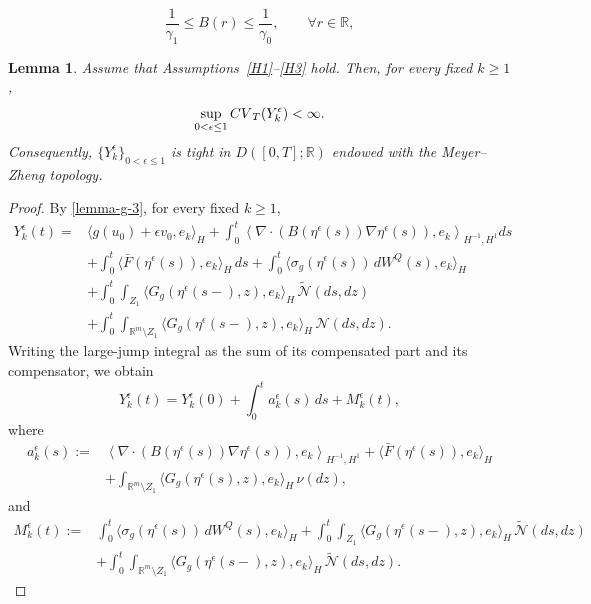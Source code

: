 \documentclass[10pt,a4paper]{amsart}
\theoremstyle{plain}
\newtheorem{lemma}[theorem]{Lemma}
\numberwithin{equation}{section}
\begin{document}
\begin{equation}\label{lemma-Br}
\frac{1}{\gamma_1} \leq B(r) \leq \frac{1}{\gamma_0}, \qquad \forall r \in \mathbb{R},
\end{equation}

\begin{lemma}\label{lem:conditional-variation-Yk}
Assume that Assumptions~\ref{H1}--\ref{H3} hold. Then, for every fixed \(k\ge1\),
\[
\sup_{0<\epsilon\le1}{\rm CV}_{T}(Y_k^\epsilon)<\infty .
\]
Consequently, \(\{Y_k^\epsilon\}_{0<\epsilon\le1}\) is tight in \(D([0,T];\mathbb R)\) endowed with the Meyer--Zheng topology.
\end{lemma}

\begin{proof}
By \eqref{lemma-g-3}, for every fixed \(k\ge1\),
\[
\begin{aligned}
Y_k^\epsilon(t)={}&\langle g(u_0)+\epsilon v_0,e_k\rangle_H +\int_0^t\left\langle\nabla\cdot\left(B(\eta^\epsilon(s))\nabla\eta^\epsilon(s)\right),e_k
\right\rangle_{H^{-1},H^1} ds  \\
&+\int_0^t\langle \bar F(\eta^\epsilon(s)),e_k\rangle_H\,ds   +\int_0^t\langle \sigma_g(\eta^\epsilon(s))\,dW^Q(s),e_k\rangle_H  \\
&+\int_0^t\int_{Z_1}\langle G_g(\eta^\epsilon(s-),z),e_k\rangle_H\,\tilde{\mathcal N}(ds,dz)    \\
&+\int_0^t\int_{\mathbb R^m\setminus Z_1}\langle G_g(\eta^\epsilon(s-),z),e_k\rangle_H\,\mathcal N(ds,dz).
\end{aligned}
\]
Writing the large-jump integral as the sum of its compensated part and its
compensator, we obtain
\[
Y_k^\epsilon(t)=Y_k^\epsilon(0)+\int_0^t a_k^\epsilon(s)\,ds+M_k^\epsilon(t),
\]
where
\[
\begin{aligned}
a_k^\epsilon(s):={}&\left\langle\nabla\cdot\left(B(\eta^\epsilon(s))\nabla\eta^\epsilon(s)\right),e_k\right\rangle_{H^{-1},H^1} +\langle \bar F(\eta^\epsilon(s)),e_k\rangle_H   \\
&+\int_{\mathbb R^m\setminus Z_1}\langle G_g(\eta^\epsilon(s),z),e_k\rangle_H\,\nu(dz),
\end{aligned}
\]
and
\[
\begin{aligned}
M_k^\epsilon(t):={}&\int_0^t\langle \sigma_g(\eta^\epsilon(s))\,dW^Q(s),e_k\rangle_H    +\int_0^t\int_{Z_1}
\langle G_g(\eta^\epsilon(s-),z),e_k\rangle_H\, \tilde{\mathcal N}(ds,dz)                                            \\
&+\int_0^t\int_{\mathbb R^m\setminus Z_1}\langle G_g(\eta^\epsilon(s-),z),e_k\rangle_H\,\tilde{\mathcal N}(ds,dz).

\end{aligned}\]
\end{proof}
\end{document}
